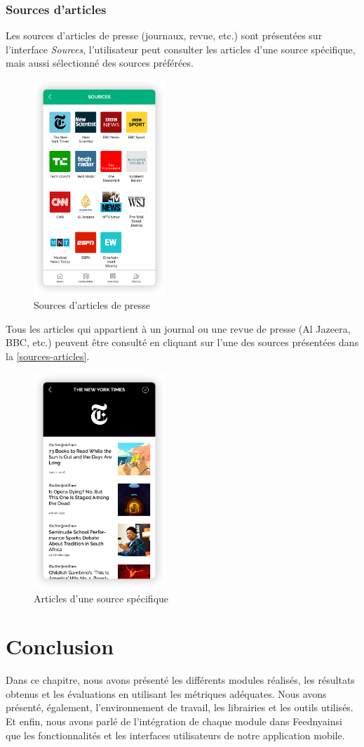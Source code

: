  \subsubsection{Sources d'articles}
Les sources d'articles de presse (journaux, revue, etc.) sont présentées sur l'interface \emph{Sources}, l'utilisateur peut consulter les articles d'une source spécifique, mais aussi sélectionné des sources préférées.
\begin{figure}[H]
    \centering
    \includegraphics[width=140pt]{img/chapter4/feedny/en-sources.png}
    \caption{Sources d'articles de presse}
\end{figure}

Tous les articles qui appartient à un journal ou une revue de presse (Al Jazeera, BBC, etc.) peuvent être consulté en cliquant sur l'une des sources présentées dans la \autoref{sources-articles}.
\begin{figure}[H]
    \centering
    \includegraphics[width=140pt]{img/chapter4/feedny/en-articles-sources.png}
    \caption{Articles d'une source spécifique}
    \label{sources-articles}
\end{figure}

\section{Conclusion}
Dans ce chapitre, nous avons présenté les différents modules réalisés, les résultats obtenus et les évaluations en utilisant les métriques adéquates. Nous avons présenté, également, l'environnement de travail, les librairies et les outils utilisés. Et enfin, nous avons parlé de l'intégration de chaque module dans \textquotedbl Feedny\textquotedbl ainsi que les fonctionnalités et les interfaces utilisateurs de notre application mobile.